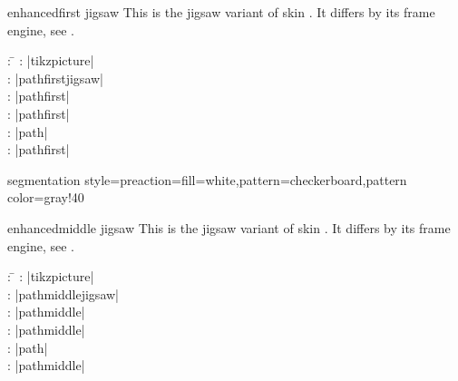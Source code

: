 \clearpage
\begin{docSkin}{enhancedfirst jigsaw}
  This is the jigsaw variant of skin .
  It differs by its frame engine, see .
\begin{tcolorbox}[skintable=enhancedfirst jigsaw]
  \begin{tabbing}
    : \=\kill
    :  \> |tikzpicture|\\ 
    :           \> |pathfirstjigsaw|\\
    : \> |pathfirst|\\ 
    :        \> |pathfirst|\\
    :    \> |path|\\
    :           \> |pathfirst|
  \end{tabbing}
\end{tcolorbox}
\end{docSkin}


\begin{dispExample*}{segmentation style={preaction={fill=white},pattern=checkerboard,pattern color=gray!40}}
\end{dispExample*}


\clearpage
\begin{docSkin}{enhancedmiddle jigsaw}
  This is the jigsaw variant of skin .
  It differs by its frame engine, see .
\begin{tcolorbox}[skintable=enhancedmiddle jigsaw]
  \begin{tabbing}
    : \=\kill
    :  \> |tikzpicture|\\ 
    :           \> |pathmiddlejigsaw|\\
    : \> |pathmiddle|\\ 
    :        \> |pathmiddle|\\
    :    \> |path|\\
    :           \> |pathmiddle|
  \end{tabbing}
\end{tcolorbox}
\end{docSkin}


